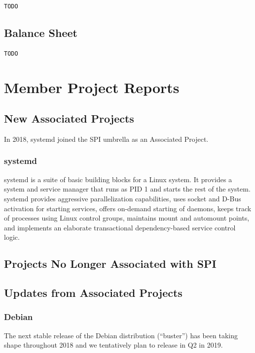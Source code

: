 \documentclass[a4paper]{report}
\begin{document}
\begin{verbatim}
TODO
\end{verbatim}

\section{Balance Sheet}

\begin{verbatim}
TODO
\end{verbatim}

\chapter{Member Project Reports}

\section{New Associated Projects}

In 2018, systemd joined the SPI umbrella as an Associated Project.

\subsection{systemd}

systemd is a suite of basic building blocks for a Linux system. It
provides a system and service manager that runs as PID 1 and starts the
rest of the system. systemd provides aggressive parallelization
capabilities, uses socket and D-Bus activation for starting services,
offers on-demand starting of daemons, keeps track of processes using
Linux control groups, maintains mount and automount points, and
implements an elaborate transactional dependency-based service control
logic.

\section{Projects No Longer Associated with SPI}

\section{Updates from Associated Projects}

\subsection{Debian}

The next stable release of the Debian distribution (``buster'') has been
taking shape throughout 2018 and we tentatively plan to release in Q2 in
2019.
\end{document}
